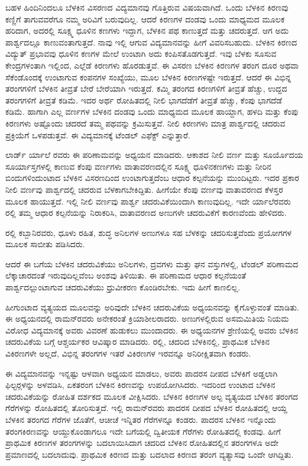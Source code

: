 ಬಹಳ ಹಿಂದಿನಿಂದಲೂ ಬೆಳಕಿನ ವಿಸರಣದ ವಿದ್ಯಮಾನವು ಗೊತ್ತಿರುವ ವಿಷಯವಾಗಿದೆ. ಒಂದು ಬೆಳಕಿನ ಕಿರಣವು ಕಣ್ಣಿಗೆ ತಾಗುವವರೆಗೂ ನಮ್ಮ ಅರಿವಿಗೆ ಬರುವುದಿಲ್ಲ. ಆದರೆ ಕಿರಣಗಳ ದಂಡವು ಒಂದು ಮಾಧ್ಯಮದ ಮೂಲಕ ಹರಿದಾಗ, ಅದರಲ್ಲಿ ಸೂಕ್ಷ್ಮ ಧೂಳಿನ ಕಣಗಳು ಇದ್ದಾಗ, ಬೆಳಕಿನ ಪಥ ಕಾಣುತ್ತದೆ ಮತ್ತು ಚದರುತ್ತದೆ. ಆಗ ಅದು ಪಾರ್ಶ್ವದಲ್ಲೂ ಕಾಣುವಂತಾಗುತ್ತದೆ. ನಾವು ಇಲ್ಲಿ ಆಗುವ ವಿದ್ಯಮಾನವನ್ನು ಹೀಗೆ ವಿವರಿಸಬಹುದು. ಬೆಳಕಿನ ಕಿರಣದ ವಿದ್ಯುತ್ ಪ್ರಭಾವವು ಧೂಳಿನ ಕಣಗಳ ಮೇಲೆ ಉಂಟಾಗಿ ಅದು ಕಂಪಿಸತೊಡಗುತ್ತದೆ. ಇವು ಬೆಳಕು ಸೂಸುವ ಕೇಂದ್ರಗಳಂತಾಗಿ ಇಲ್ಲಿಂದ, ಎಲ್ಲೆಡೆ ಕಿರಣಗಳು ಹೊರಡುತ್ತವೆ. ಈ ವಿಸರಣ ಬೆಳಕಿನ ಕಿರಣಗಳ ತರಂಗ ದೂರ ಅಥವಾ ಸೆಕೆಂಡೊಂದಕ್ಕೆ ಉಂಟಾಗುವ ಕಂಪನಗಳ ಸಂಖ್ಯೆಯು, ಮೂಲ ಬೆಳಕಿನ ಕಿರಣಗಳಷ್ಟೇ ಇರುತ್ತದೆ. ಆದರೆ ಈ ವಿಭಿನ್ನ ತರಂಗಗಳಿಗೆ ಬೆಳಕಿನ ತೀವ್ರತೆ ಬೇರೆ ಬೇರೆಯಾಗಿ ಇರುತ್ತದೆ. ಕಮ್ಮಿ ತರಂಗದ ಕಿರಣಗಳಿಗೆ ತೀವ್ರತೆ ಹೆಚ್ಚು, ಉದ್ದದ ತರಂಗಗಳಿಗೆ ತೀವ್ರತೆ ಕಡಿಮೆ. ಇದರ ಅರ್ಥ ರೋಹಿತದಲ್ಲಿ ನೀಲಿ ಭಾಗದೆಡೆಗೆ ತೀವ್ರತೆ ಹೆಚ್ಚು, ಕೆಂಪು ಭಾಗದೆಡೆ ಕಡಿಮೆ. ಹಾಗಾಗಿ ಎಲ್ಲ ವರ್ಣಗಳ ಬೆಳಕಿನ ದಂಡವು ಒಂದು ಮಾಧ್ಯಮದ ಮೂಲಕ ಹಾಯ್ದಾಗ, ಹಳದಿ ಮತ್ತು ಕೆಂಪು ಕಿರಣಗಳು ಅಷ್ಟೊಂದು ಚದರದೆ ತಮ್ಮ ಪಥವನ್ನು ಕ್ರಮಿಸುತ್ತವೆ. ನೀಲಿ ಕಿರಣಗಳು ಮಾತ್ರ ಪಾರ್ಶ್ವದಲ್ಲಿ ಚದರುವ ಪ್ರಕ್ರಿಯೆಗೆ ಒಳಪಡುತ್ತವೆ. ಈ ವಿದ್ಯಮಾನಕ್ಕೆ ಟೆಂಡಲ್ ಎಫೆಕ್ಟ್ ಎನ್ನುತ್ತಾರೆ.

ಲಾರ್ಡ್ ರ್ಯಾಲೆ ರವರು ಈ ಪರಿಣಾಮವನ್ನು ಅಧ್ಯಯನ ಮಾಡಿದರು. ಆಕಾಶದ ನೀಲಿ ವರ್ಣ ಮತ್ತು ಸೂರ್ಯೊದಯ ಸೂರ್ಯಾಸ್ತಗಳಲ್ಲಿ ಕಾಣುವ ಕೆಂಪು ವರ್ಣಗಳು ವಾತಾವರಣದಲ್ಲಿನ ಸೂಕ್ಷ್ಮ ಧೂಳಿನಕಣಗಳು ಮತ್ತು ನೀರಿನ ಬಿಂದುಗಳಿಂದುಂಟಾದ ಬೆಳಕಿನ ವಿಸರಣದಿಂದ ಉಂಟಾಗುತ್ತದೆಂಬ ಆಧಾರ ಕಲ್ಪನೆಯನ್ನು ಮುಂದಿಟ್ಟರು. ಇದರ ಪ್ರಕಾರ ನೀಲಿ ವರ್ಣವು ಪಾರ್ಶ್ವದಲ್ಲಿ ಚದರುವ ಬೆಳಕಾಗಬೇಕಿದ್ದಿತು. ಹೀಗೆಯೇ ಕೆಂಪು ವರ್ಣವು ವಾತಾವರಣದ ಕೆಳಸ್ತರ ಮೂಲಕ ಹಾಯುತ್ತದೆ. ಇಲ್ಲಿ ನೀಲಿ ವರ್ಣವು ಪಾರ್ಶ್ವ ಚದರುವಿಕೆಯಿಂದಾಗಿ ಕಾಣುವುದಿಲ್ಲ. ಇದೇ ರ್ಯಾಲೆರವರು ರಲ್ಲಿ ತಮ್ಮ ಆಧಾರ ಕಲ್ಪನೆಯನ್ನು ನಿರಾಕರಿಸಿ, ವಾತಾವರಣದ ಅಣುಗಳೇ ಚದರುವಿಕೆಗೆ ಕಾರಣವೆಂದು ಹೇಳಿದರು.

ರಲ್ಲಿ ಕಬ್ಬಾನಿರವರು, ಧೂಳು ರಹಿತ, ಶುದ್ಧ ಅನಿಲಗಳ ಅಣುಗಳೂ ಸಹ ಬೆಳಕನ್ನು ಚದರಿಸುತ್ತವೆಂದು ಪ್ರಯೋಗಗಳ ಮೂಲಕ ಸಾಬೀತು ಪಡಿಸಿದರು.

ಆದರೆ ಈ ಬಗೆಯ ಬೆಳಕಿನ ಚದರುವಿಕೆಯು ಅನಿಲಗಳು, ದ್ರವಗಳು ಮತ್ತು ಘನ ವಸ್ತುಗಳಲ್ಲಿ, ಟೆಂಡಲ್ ಪರಿಣಾಮದ ಲೆಕ್ಕಾಚಾರದಂತೆ ಇರುವುದಿಲ್ಲವೆಂಬ ಅಂಶವು ತಿಳಿಯಿತು. ಈ ಪರಿಣಾಮದ ಆಧಾರ ಕಲ್ಪನೆಯಂತೆ ಪಾರ್ಶ್ವದಲ್ಲುಂಟಾಗುವ ಚದರುವಿಕೆಯು ಧ್ರುವೀಕರಣ ಕೊಂಡಿರಬೇಕು. ಇದು ಹೀಗೆ ಕಾಣಲಿಲ್ಲ.

ಹೀಗುಂಟಾದ ವ್ಯತ್ಯಯದ ಮೂಲವನ್ನು ಅರಿವುದೇ ಬೆಳಕಿನ ಚದರುವಿಕೆಯ ಅಧ್ಯಯನವನ್ನು ಕೈಗೊಳ್ಳುವಂತೆ ಮಾಡಿತು. ಈ ಅಧ್ಯಯನದಲ್ಲಿ ರಾಮನ್‍ರವರು ಅನೇಕರಂತೆ ಕ್ರಿಯಾಶೀಲರಾದರು. ಅಣುಗಳಲ್ಲಿರುವ ಅಸಮಮಿತಿಯ ನಿಯಮ ವಿರೋಧ ವಿದ್ಯಮಾನಕ್ಕೆ ಅವರು ವಿವರಣೆ ಹುಡುಕಲು ಮುಂದಾದರು. ಈ ಅಧ್ಯಯನಗಳ ಶ್ರೇಣಿಯಲ್ಲಿ ಅವರು ಬೆಳಕಿನ ಚದರುವಿಕೆಯ ಬಗ್ಗೆ ಆಶ್ಚರ್ಯಕರ ಆವಿಷ್ಕಾರ ಮಾಡಿದರು. ರಲ್ಲಿ, ಚದರಿದ ಬೆಳಕಿನಲ್ಲಿ, ಪ್ರಾಥಮಿಕ ಬೆಳಕಿನ ವಿಕಿರಣಗಳೇ ಅಲ್ಲದೆ, ವಿಭಿನ್ನ ತರಂಗಗಳ ಇತರೆ ವಿಕಿರಣಗಳ ಇರವನ್ನೂ ಅನಿರೀಕ್ಷಿತವಾಗಿ ಕಂಡರು.

ಈ ವಿದ್ಯಮಾನವನ್ನು ಇನ್ನಷ್ಟು ಆಳವಾಗಿ ಅಧ್ಯಯನ ಮಾಡಲು, ಅವರು ಪಾದರಸ ದೀಪದ ಬೆಳಕಿಗೆ ಅಡ್ಡಲಾಗಿ ಫಿಲ್ಟರ್‍ಗಳನ್ನು ಅಳವಡಿಸಿ, ಏಕತರಂಗ ಬೆಳಕಿನ ಕಿರಣವನ್ನು ಉಪಯೋಗಿಸಿದರು. ಇದರಿಂದ ಉಂಟಾದ ಬೆಳಕಿನ ಚದರುವಿಕೆಯನ್ನು ರೋಹಿತ ದರ್ಶಕದ ಮೂಲಕ ವೀಕ್ಷಿಸಿದರು. ಬೆಳಕಿನ ಕಿರಣಗಳ ಅಲ್ಪ ವ್ಯತ್ಯಯದ ಬೆಳಕಿನ ತರಂಗದ ಗೆರೆಗಳನ್ನು ರೋಹಿತದಲ್ಲಿ ತೋರಿಸುತ್ತದೆ. ಇಲ್ಲಿ ರಾಮನ್‍ರವರು ಪಾದರಸ ದೀಪದ ಬೆಳಕಿನ ರೋಹಿತದಲ್ಲಿ ಆಯ್ದ ಬೆಳಕಿನ ತರಂಗದ ಗೆರೆಗಳ ಜೊತೆಗೆ, ಆಚೀಚೆ ಇನ್ನಿತರ ಗೆರೆಗಳನ್ನೂ ಕಂಡರು. ಪಾದರಸ ಬೆಳಕಿನ ಇನ್ನೊಂದು ತರಂಗ\enginline{-}ಕಿರಣವನ್ನು ಆಯ್ದುಕೊಂಡಾಗಲೂ ಇದೇ ಬಗೆಯಲ್ಲಿ ದ್ವಿತೀಯಕ ಗೆರೆಗಳು ರೋಹಿತದಲ್ಲಿ ಕಂಡವು. ಹೀಗೆ ಪ್ರಾಥಮಿಕ ಕಿರಣಗಳ ತರಂಗಗಳನ್ನು ಬದಲಾಯಿಸಿದಾಗ ಚದರಿದ ಬೆಳಕಿನ ರೋಹಿತದಲ್ಲಿನ ತರಂಗಗಳೂ ಅದೇ ಪ್ರಮಾಣದಲ್ಲಿ ಬದಲಾದುವು. ಪ್ರಾಥಮಿಕ ಕಿರಣದ ಮತ್ತು ಬದಲಾದ ಕಿರಣದ ತರಂಗ ವ್ಯತ್ಯಾಸವು ಒಂದೇ ಆಗಿದ್ದಿತು.

